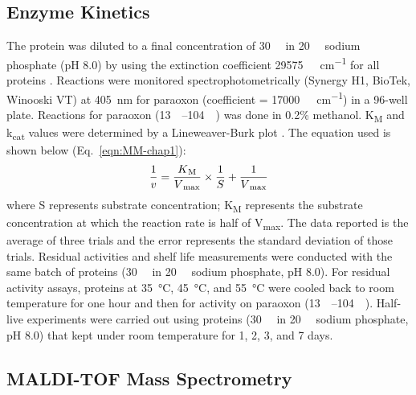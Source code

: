 \begin{refsection}
\subsection{Enzyme Kinetics}
\label{sec:kinetics-method}

The protein was diluted to a final concentration of \SI{30}{\nano\Molar} in
\SI{20}{\milli\Molar} sodium phosphate (pH 8.0) by using the extinction
coefficient \SI{29575}{\per\Molar\per\cm} for all proteins \cite{Gasteiger2005,
Pace1995}.  Reactions were monitored spectrophotometrically (Synergy H1,
BioTek, Winooski VT) at \SI{405}{\nm} for paraoxon (coefficient =
\SI{17000}{\per\Molar\per\cm}) \cite{Baker2011b} in a 96-well plate. Reactions
for paraoxon (\SIrange{13}{104}{\micro\Molar}) was done in 0.2\% methanol.
K\textsubscript{M} and k\textsubscript{cat} values were determined by a
Lineweaver-Burk plot \cite{Baker2011b}. The equation used is shown below
(Eq.~\ref{eqn:MM-chap1}):
\begin{equation} 
    \frac{1}{v} =
    \frac{K\textsubscript{M}}{V\textsubscript{max}}\times\frac{1}{S} +
    \frac{1}{V\textsubscript{max}} 
    \label{eqn:MM-chap1}
\end{equation}
where S represents substrate concentration; K\textsubscript{M} represents the
substrate concentration at which the reaction rate is half of
V\textsubscript{max}. The data reported is the average of three trials and the
error represents the standard deviation of those trials. Residual activities
and shelf life measurements were conducted with the same batch of proteins
(\SI{30}{\nano\Molar} in \SI{20}{\milli\Molar} sodium phosphate, pH 8.0). For
residual activity assays, proteins at \SI{35}{\celsius}, \SI{45}{\celsius}, and
\SI{55}{\celsius} were cooled back to room temperature for one hour and then
for activity on paraoxon (\SIrange{13}{104}{\micro\Molar}). Half-live
experiments were carried out using proteins (\SI{30}{\nano\Molar} in
\SI{20}{\milli\Molar} sodium phosphate, pH 8.0) that kept under room
temperature for 1, 2, 3, and 7 days.  

\subsection{MALDI-TOF Mass Spectrometry}


\end{refsection}
